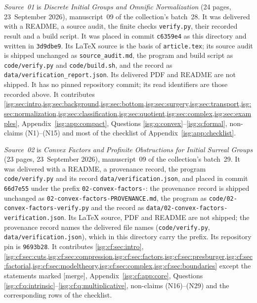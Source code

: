 \documentclass[11pt]{article}
\theoremstyle{definition}
\theoremstyle{remark}
\newcommand{\fn}[1]{\nolinkurl{#1}}
\begin{document}
\emph{Source~01} is \emph{Discrete Initial Groups and Omnific
Normalization} (24 pages, 23~September 2026), manuscript~09 of the
collection's batch~28. It was delivered with a README, a source audit,
the finite checks \texttt{verify.py}, their recorded result and a build
script. It was placed in commit \texttt{c6359e4} as this directory and
written in \texttt{3d9dbe9}. Its LaTeX source is the basis of
\fn{article.tex}; its source audit is shipped unchanged as
\fn{source_audit.md}, the program and build script as \fn{code/verify.py}
and \fn{code/build.sh}, and the record as
\fn{data/verification_report.json}. Its delivered PDF and README are not
shipped. It has no pinned repository commit; its read identifiers are
those recorded above. It contributes
\cref{isg:sec:intro,isg:sec:background,isg:sec:bottom,isg:sec:surgery,isg:sec:transport,isg:sec:normalization,isg:sec:classification,isg:sec:quotient,isg:sec:complex,isg:sec:examples},
Appendix~\ref{isg:app:compact}, Questions
\ref{isg:q:convex}--\ref{isg:q:formal}, non-claims
\textup{(N1)}--\textup{(N15)} and most of the checklist of
Appendix~\ref{isg:app:checklist}.

\emph{Source~02} is \emph{Convex Factors and Profinite Obstructions for
Initial Surreal Groups} (23 pages, 23~September 2026), manuscript~09 of
the collection's batch~29. It was delivered with a README, a provenance
record, the program \texttt{code/verify.py} and its record
\texttt{data/verification.json}, and placed in commit \texttt{66d7e55}
under the prefix \fn{02-convex-factors-}: the provenance record is shipped
unchanged as \fn{02-convex-factors-PROVENANCE.md}, the program as
\fn{code/02-convex-factors-verify.py} and the record as
\fn{data/02-convex-factors-verification.json}. Its LaTeX source, PDF and
README are not shipped; the provenance record names the delivered file
names (\fn{code/verify.py}, \fn{data/verification.json}), which in this
directory carry the prefix. Its repository pin is \texttt{9693b28}. It
contributes \cref{isg:cf:sec:intro},
\cref{isg:cf:sec:cuts,isg:cf:sec:compression,isg:cf:sec:factors,isg:cf:sec:presburger,isg:cf:sec:factorial,isg:cf:sec:modeltheory,isg:cf:sec:complex,isg:cf:sec:boundaries}
except the statements marked \textup{[merge]}, Appendix~\ref{isg:cf:app:core},
Questions \ref{isg:cf:q:intrinsic}--\ref{isg:cf:q:multiplicative},
non-claims \textup{(N16)}--\textup{(N29)} and the corresponding rows of
the checklist.
\end{document}
